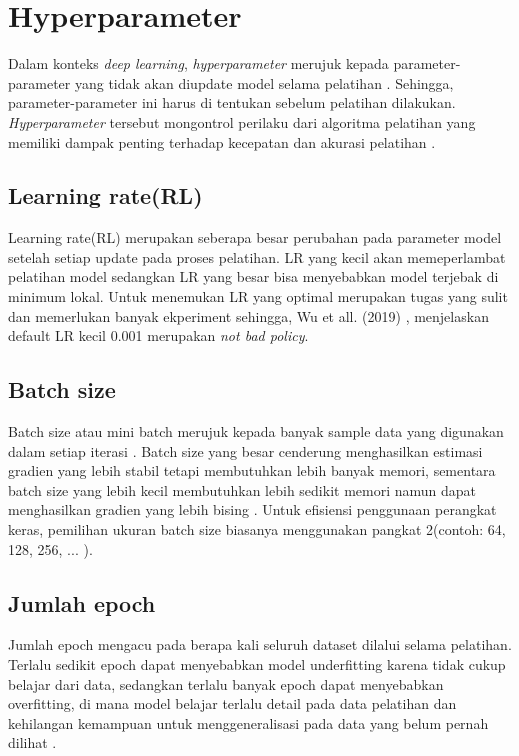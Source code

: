 \section{Hyperparameter}
\noindent Dalam konteks \textit{deep learning}, \textit{hyperparameter} merujuk kepada parameter-parameter yang tidak akan diupdate model selama pelatihan \cite{yu_hyper-parameter_2020}.  Sehingga, parameter-parameter ini harus di tentukan sebelum pelatihan dilakukan. \textit{Hyperparameter} tersebut mongontrol perilaku dari algoritma pelatihan yang memiliki dampak penting terhadap kecepatan dan akurasi pelatihan \cite{goodfellow_deep_2016}.  

\subsection{Learning rate(RL)}
\noindent Learning rate(RL) merupakan seberapa besar perubahan pada parameter model setelah setiap update pada proses pelatihan. LR yang kecil akan memeperlambat pelatihan model sedangkan LR yang besar bisa menyebabkan model terjebak di minimum lokal. Untuk menemukan LR yang optimal merupakan tugas yang sulit dan memerlukan banyak ekperiment sehingga, Wu et all. (2019) \cite{wu_demystifying_2019}, menjelaskan default LR kecil 0.001 merupakan \textit{not bad policy}.

\subsection{Batch size }
\noindent Batch size atau mini batch merujuk kepada banyak sample data yang digunakan dalam setiap iterasi \cite{devarakonda_adabatch_2017}.  Batch size yang besar cenderung menghasilkan estimasi gradien yang lebih stabil tetapi membutuhkan lebih banyak memori, sementara batch size yang lebih kecil membutuhkan lebih sedikit memori namun dapat menghasilkan gradien yang lebih bising \cite{goodfellow_deep_2016}. Untuk efisiensi penggunaan perangkat keras, pemilihan ukuran batch size biasanya menggunakan pangkat 2(contoh: 64, 128, 256, ... )\cite{bishop_deep_2024}.

\subsection{Jumlah epoch}
\noindent Jumlah epoch mengacu pada berapa kali seluruh dataset dilalui selama pelatihan. Terlalu sedikit epoch dapat menyebabkan model underfitting karena tidak cukup belajar dari data, sedangkan terlalu banyak epoch dapat menyebabkan overfitting, di mana model belajar terlalu detail pada data pelatihan dan kehilangan kemampuan untuk menggeneralisasi pada data yang belum pernah dilihat \cite{goodfellow_deep_2016}.

